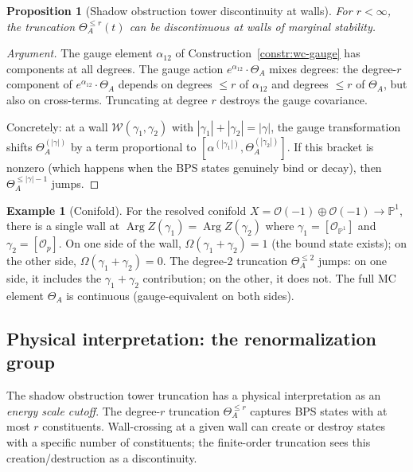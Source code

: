 \documentclass[11pt]{article}
\newtheorem{proposition}[theorem]{Proposition}
\theoremstyle{definition}
\newtheorem{example}[theorem]{Example}
\theoremstyle{remark}
\newcommand{\cO}{\mathcal{O}}
\newcommand{\cW}{\mathcal{W}}
\DeclareMathOperator{\Arg}{Arg}
\begin{document}
\begin{proposition}[Shadow obstruction tower discontinuity at walls]
\label{prop:shadow-jump}
For $r < \infty$, the truncation $\Theta^{\leq r}_A(t)$ can be
discontinuous at walls of marginal stability.
\end{proposition}

\begin{proof}[Argument]
The gauge element $\alpha_{12}$ of Construction~\ref{constr:wc-gauge}
has components at all degrees. The gauge action
$e^{\alpha_{12}} \cdot \Theta_A$ mixes degrees: the degree-$r$ component
of $e^{\alpha_{12}} \cdot \Theta_A$ depends on degrees $\leq r$ of
$\alpha_{12}$ and degrees $\leq r$ of $\Theta_A$, but also on cross-terms.
Truncating at degree $r$ destroys the gauge covariance.

Concretely: at a wall $\cW(\gamma_1, \gamma_2)$ with
$|\gamma_1| + |\gamma_2| = |\gamma|$, the gauge transformation shifts
$\Theta^{(|\gamma|)}_A$ by a term proportional to $[\alpha^{(|\gamma_1|)},
\Theta^{(|\gamma_2|)}_A]$. If this bracket is nonzero (which happens when
the BPS states genuinely bind or decay), then $\Theta^{\leq |\gamma|-1}_A$
jumps.
\end{proof}

\begin{example}[Conifold]
For the resolved conifold $X = \cO(-1) \oplus \cO(-1) \to \mathbb{P}^1$,
there is a single wall at $\Arg Z(\gamma_1) = \Arg Z(\gamma_2)$ where
$\gamma_1 = [\cO_{\mathbb{P}^1}]$ and $\gamma_2 = [\cO_p]$. On one
side of the wall, $\Omega(\gamma_1 + \gamma_2) = 1$ (the bound state
exists); on the other side, $\Omega(\gamma_1 + \gamma_2) = 0$. The
degree-2 truncation $\Theta^{\leq 2}_A$ jumps: on one side, it includes
the $\gamma_1 + \gamma_2$ contribution; on the other, it does not. The
full MC element $\Theta_A$ is continuous (gauge-equivalent on both sides).
\end{example}

\subsection{Physical interpretation: the renormalization group}
\label{ssec:rg-interpretation}

The shadow obstruction tower truncation has a physical interpretation as an
\emph{energy scale cutoff}. The degree-$r$ truncation $\Theta^{\leq r}_A$
captures BPS states with at most $r$ constituents. Wall-crossing at a
given wall can create or destroy states with a specific number of
constituents; the finite-order truncation sees this creation/destruction
as a discontinuity.
\end{document}
